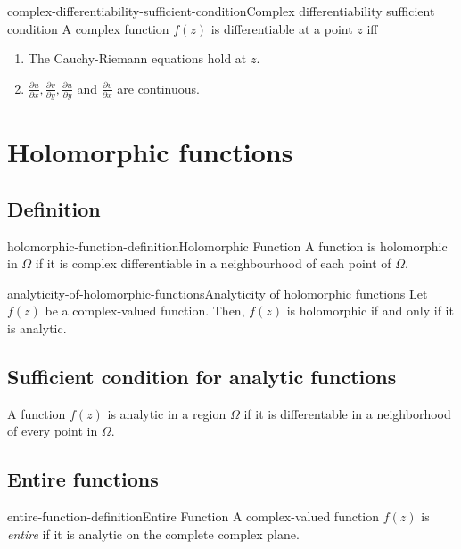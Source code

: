 \documentclass[preview]{standalone}
\begin{document}
\begin{snippettheorem}{complex-differentiability-sufficient-condition}{Complex differentiability sufficient condition}
    A complex function \(f(z)\) is differentiable at a point \(z\)
    iff
    \begin{enumerate}
        \item The Cauchy-Riemann equations hold at \(z\).
        \item \(\frac{\partial u}{\partial x}, \frac{\partial v}{\partial y},
        \frac{\partial u}{\partial y}\) and \(\frac{\partial v}{\partial x}\)
        are continuous.
    \end{enumerate}
\end{snippettheorem}

\section{Holomorphic functions}

\subsection{Definition}

\begin{snippetdefinition}{holomorphic-function-definition}{Holomorphic Function}
    A function is holomorphic in \(\Omega\) if it is complex differentiable
    in a neighbourhood of each point of \(\Omega\).
\end{snippetdefinition}

\begin{snippettheorem}{analyticity-of-holomorphic-functions}{Analyticity of holomorphic functions}
    Let \(f(z)\) be a complex-valued function.
    Then, \(f(z)\) is holomorphic if and only if it is analytic.
\end{snippettheorem}


\subsection{Sufficient condition for analytic functions}

A function \(f(z)\) is analytic in a region \(\Omega\) if it is differentable
in a neighborhood of every point in \(\Omega\).

\subsection{Entire functions}

\begin{snippetdefinition}{entire-function-definition}{Entire Function}
    A complex-valued function \(f(z)\) is \textit{entire} if it is analytic on the complete complex plane.
\end{snippetdefinition}
\end{document}
